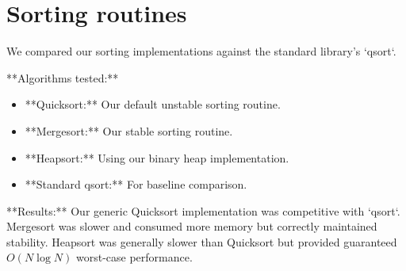 \chapter{Sorting routines}\label{chap:benchmark:sorting}

We compared our sorting implementations against the standard library's `qsort`.

**Algorithms tested:**
\begin{itemize}
    \item **Quicksort:** Our default unstable sorting routine.
    \item **Mergesort:** Our stable sorting routine.
    \item **Heapsort:** Using our binary heap implementation.
    \item **Standard qsort:** For baseline comparison.
\end{itemize}

**Results:**
Our generic Quicksort implementation was competitive with `qsort`. Mergesort was slower and consumed more memory but correctly maintained stability. Heapsort was generally slower than Quicksort but provided guaranteed $O(N \log N)$ worst-case performance.
